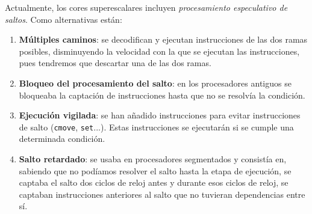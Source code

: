 \documentclass[10pt,a4paper,spanish]{report}
\begin{document}
Actualmente, los cores superescalares incluyen \textit{\textcolor{azul}{procesamiento especulativo de saltos}}. Como alternativas están:

\begin{enumerate}
    \item \textbf{\textcolor{azul}{Múltiples caminos}}: se decodifican y ejecutan instrucciones de las dos ramas posibles, disminuyendo la velocidad con la que se ejecutan las instrucciones, pues tendremos que descartar una de las dos ramas.

    \item \textbf{\textcolor{azul}{Bloqueo del procesamiento del salto}}: en los procesadores antiguos se bloqueaba la captación de instrucciones hasta que no se resolvía la condición. 

    \item \textbf{\textcolor{azul}{Ejecución vigilada}}: se han añadido instrucciones para evitar instrucciones de salto (\verb*|cmove|, \verb*|set|...). Estas instrucciones se ejecutarán si se cumple una determinada condición.

    \item \textbf{\textcolor{azul}{Salto retardado}}: se usaba en procesadores segmentados y consistía en, sabiendo que no podíamos resolver el salto hasta la etapa de ejecución, se captaba el salto dos ciclos de reloj antes y durante esos ciclos de reloj, se captaban instrucciones anteriores al salto que no tuvieran dependencias entre sí.
\end{enumerate}
\end{document}
